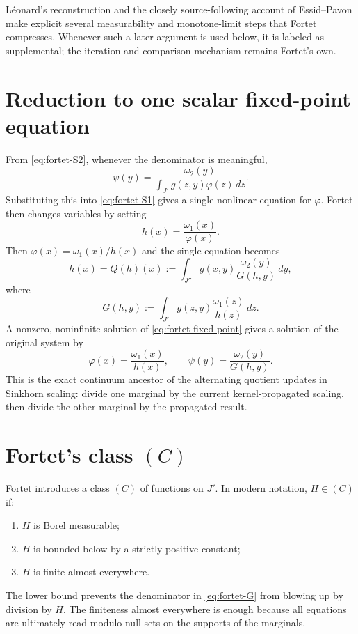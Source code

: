 \begin{remark}
L\'eonard's reconstruction \cite{Leonard2019} and the closely source-following
account of Essid--Pavon make explicit several measurability and monotone-limit
steps that Fortet compresses.  Whenever such a later argument is used below, it
is labeled as supplemental; the iteration and comparison mechanism remains
Fortet's own.
\end{remark}

\section{Reduction to one scalar fixed-point equation}
From \eqref{eq:fortet-S2}, whenever the denominator is meaningful,
\[
  \psi(y)=\frac{\omega_2(y)}{\int_{J'}g(z,y)\varphi(z)\,dz}.
\]
Substituting this into \eqref{eq:fortet-S1} gives a single nonlinear equation for $\varphi$.
Fortet then changes variables by setting
\[
  h(x)=\frac{\omega_1(x)}{\varphi(x)}.
\]
Then $\varphi(x)=\omega_1(x)/h(x)$ and the single equation becomes
\begin{equation}
  h(x)=Q(h)(x)
  :=\int_{J''} g(x,y)
    \frac{\omega_2(y)}{G(h,y)}\,dy, \tag{F}\label{eq:fortet-fixed-point}
\end{equation}
where
\begin{equation}
  G(h,y):=\int_{J'}g(z,y)\frac{\omega_1(z)}{h(z)}\,dz. \tag{G}\label{eq:fortet-G}
\end{equation}
A nonzero, noninfinite solution of \eqref{eq:fortet-fixed-point} gives a solution of the original system by
\begin{equation}
  \varphi(x)=\frac{\omega_1(x)}{h(x)},
  \qquad
  \psi(y)=\frac{\omega_2(y)}{G(h,y)}. \tag{Recover}\label{eq:fortet-recover}
\end{equation}
This is the exact continuum ancestor of the alternating quotient updates in Sinkhorn scaling: divide one marginal by the current kernel-propagated scaling, then divide the other marginal by the propagated result.

\section{Fortet's class $(C)$}
Fortet introduces a class $(C)$ of functions on $J'$.
In modern notation, $H\in(C)$ if:
\begin{enumerate}[leftmargin=2em]
\item $H$ is Borel measurable;
\item $H$ is bounded below by a strictly positive constant;
\item $H$ is finite almost everywhere.
\end{enumerate}
The lower bound prevents the denominator in \eqref{eq:fortet-G} from blowing up by division by $H$.
The finiteness almost everywhere is enough because all equations are ultimately read modulo null sets on the supports of the marginals.

